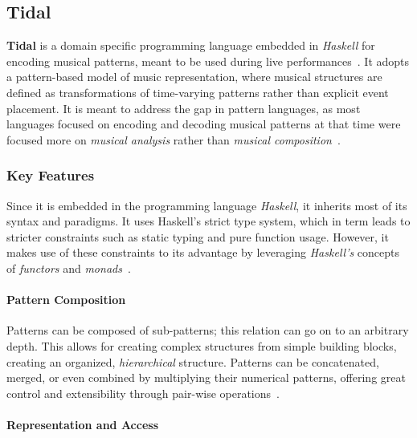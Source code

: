 \subsection{Tidal}\label{detail-subsec:tidal}

\textbf{Tidal} is a domain specific programming language embedded in \textit{Haskell} for encoding musical patterns,
meant to be used during live performances~\cite{McLean_Wiggins_2010}.
It adopts a pattern-based model of music representation, where musical structures are defined as transformations of
time-varying patterns rather than explicit event placement.
It is meant to address the gap in pattern languages, as most languages focused on encoding and decoding musical patterns
at that time were focused more on \textit{musical analysis} rather than \textit{musical
composition}~\cite{McLean_Wiggins_2010}.


\subsubsection{Key Features}

Since it is embedded in the programming language \textit{Haskell}, it inherits most of its syntax and paradigms.
It uses Haskell's strict type system, which in term leads to stricter constraints such as static typing and pure
function usage.
However, it makes use of these constraints to its advantage by leveraging \textit{Haskell's} concepts of
\textit{functors} and \textit{monads}~\cite{McLean_Wiggins_2010}.

\paragraph{Pattern Composition}

Patterns can be composed of sub-patterns; this relation can go on to an arbitrary depth.
This allows for creating complex structures from simple building blocks, creating an organized, \textit{hierarchical}
structure.
Patterns can be concatenated, merged, or even combined by multiplying their numerical patterns, offering great control
and extensibility through pair-wise operations~\cite{McLean_Wiggins_2010}.

\paragraph{Representation and Access}

